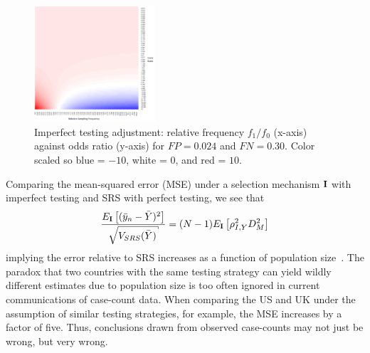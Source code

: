 \documentclass[11pt]{amsart}
\numberwithin{equation}{section}
\theoremstyle{plain}
\def\I{\bf I}
\begin{document}
\begin{figure}[!th]
\centering
\includegraphics[width = 0.4\textwidth]{../figs/mem_heatmap_article.png}
\caption{Imperfect testing adjustment: relative frequency $f_1/f_0$ (x-axis) against odds ratio (y-axis) for $FP=0.024$ and $FN=0.30$. Color scaled so blue = $-10$, white = $0$, and red = $10$.}
\label{fig:heatmap}
\vspace{-0.3cm}
\end{figure}

Comparing the mean-squared error (MSE) under a selection mechanism $\I$ with imperfect testing and SRS with perfect testing, we see that
$$
\frac{E_{\I} \left[ (\bar y_n - \bar Y)^2 \right]}{\sqrt{V_{SRS} (\bar Y)}} = (N-1) E_{\I} \left[ \rho_{I,Y}^2 D_M^2 \right]
$$
implying the error relative to SRS increases as a function of population size~\citep{Meng2018}. The paradox that two countries with the same testing strategy can yield wildly different estimates due to population size is too often ignored in current communications of case-count data.  When comparing the US and UK under the assumption of similar testing strategies, for example, the MSE increases by a factor of five.  Thus, conclusions drawn from observed case-counts may not just be wrong, but very wrong.
\end{document}
